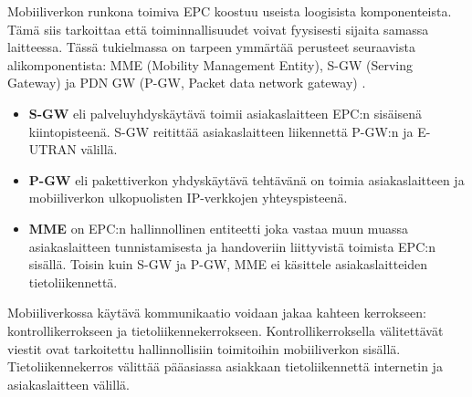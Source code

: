 Mobiiliverkon runkona toimiva EPC koostuu useista loogisista komponenteista.
Tämä siis tarkoittaa että toiminnallisuudet voivat fyysisesti sijaita samassa laitteessa. 
Tässä tukielmassa on tarpeen ymmärtää perusteet seuraavista alikomponentista: MME (Mobility Management Entity), S-GW (Serving Gateway) ja PDN GW (P-GW, Packet data network gateway) \cite{etsilte}.
\begin{itemize}
\item \textbf{S-GW} eli palveluyhdyskäytävä toimii asiakaslaitteen EPC:n sisäisenä kiintopisteenä.  S-GW reitittää asiakaslaitteen liikennettä P-GW:n ja E-UTRAN välillä.
\item \textbf{P-GW} eli pakettiverkon yhdyskäytävä tehtävänä on toimia asiakaslaitteen ja mobiiliverkon ulkopuolisten IP-verkkojen yhteyspisteenä.
\item \textbf{MME} on EPC:n hallinnollinen entiteetti joka vastaa muun muassa asiakaslaitteen tunnistamisesta ja handoveriin liittyvistä toimista EPC:n sisällä. Toisin kuin S-GW ja P-GW, MME ei käsittele asiakaslaitteiden tietoliikennettä.
\end{itemize}
\cite{3gppepc}

Mobiiliverkossa käytävä kommunikaatio voidaan jakaa kahteen kerrokseen: kontrollikerrokseen ja tietoliikennekerrokseen.
Kontrollikerroksella välitettävät viestit ovat tarkoitettu hallinnollisiin toimitoihin mobiiliverkon sisällä. 
Tietoliikennekerros välittää pääasiassa asiakkaan tietoliikennettä internetin ja asiakaslaitteen välillä.

